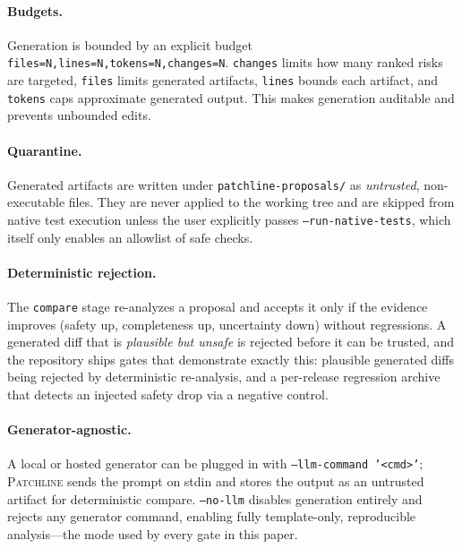\documentclass[11pt]{article}
\newcommand{\tool}{\textsc{Patchline}}
\newcommand{\code}[1]{\texttt{#1}}
\begin{document}
\paragraph{Budgets.} Generation is bounded by an explicit budget
\code{files=N,lines=N,tokens=N,changes=N}. \code{changes} limits how many ranked risks are targeted,
\code{files} limits generated artifacts, \code{lines} bounds each artifact, and \code{tokens} caps
approximate generated output. This makes generation auditable and prevents unbounded edits.

\paragraph{Quarantine.} Generated artifacts are written under \code{patchline-proposals/} as
\emph{untrusted}, non-executable files. They are never applied to the working tree and are skipped
from native test execution unless the user explicitly passes \code{--run-native-tests}, which itself
only enables an allowlist of safe checks.

\paragraph{Deterministic rejection.} The \code{compare} stage re-analyzes a proposal and accepts it
only if the evidence improves (safety up, completeness up, uncertainty down) without regressions. A
generated diff that is \emph{plausible but unsafe} is rejected before it can be trusted, and the
repository ships gates that demonstrate exactly this: plausible generated diffs being rejected by
deterministic re-analysis, and a per-release regression archive that detects an injected safety drop
via a negative control.

\paragraph{Generator-agnostic.} A local or hosted generator can be plugged in with
\code{--llm-command '<cmd>'}; \tool{} sends the prompt on stdin and stores the output as an untrusted
artifact for deterministic compare. \code{--no-llm} disables generation entirely and rejects any
generator command, enabling fully template-only, reproducible analysis---the mode used by every gate
in this paper.
\end{document}
